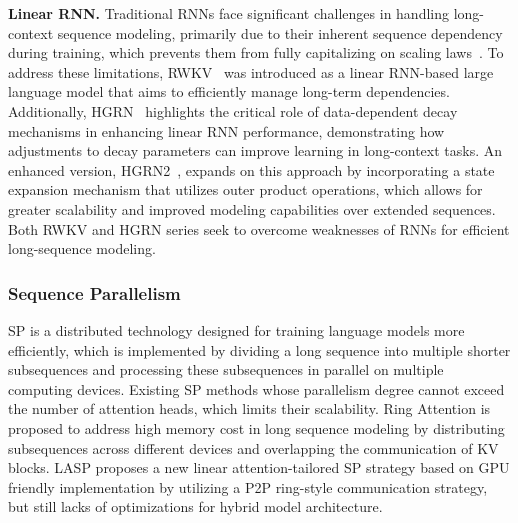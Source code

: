 \textbf{Linear RNN.} Traditional RNNs face significant challenges in handling long-context sequence modeling, primarily due to their inherent sequence dependency during training, which prevents them from fully capitalizing on scaling laws~\citep{sun2023retentive}. To address these limitations, RWKV~\citep{peng-etal-2023-rwkv,peng2024eagle} was introduced as a linear RNN-based large language model that aims to efficiently manage long-term dependencies. Additionally, HGRN~\citep{qin2024hierarchically} highlights the critical role of data-dependent decay mechanisms in enhancing linear RNN performance, demonstrating how adjustments to decay parameters can improve learning in long-context tasks. An enhanced version, HGRN2~\citep{qin2024hgrn2}, expands on this approach by incorporating a state expansion mechanism that utilizes outer product operations, which allows for greater scalability and improved modeling capabilities over extended sequences. Both RWKV and HGRN series seek to overcome weaknesses of RNNs for efficient long-sequence modeling.

\subsubsection{Sequence Parallelism}
SP \citep{li2022sequence} is a distributed technology designed for training language models more efficiently, which is implemented by dividing a long sequence into multiple shorter subsequences and processing these subsequences in parallel on multiple computing devices. Existing SP methods \citep{korthikanti2022reducing,jacobs2023deepspeed} whose parallelism degree cannot exceed the number of attention heads, which limits their scalability. Ring Attention \citep{liu2023ring} is proposed to address high memory cost in long sequence modeling by distributing subsequences across different devices and overlapping the communication of KV blocks. LASP \citep{sun2024linear} proposes a new linear attention-tailored SP strategy based on GPU friendly implementation by utilizing a P2P ring-style communication strategy, but still lacks of optimizations for hybrid model architecture.